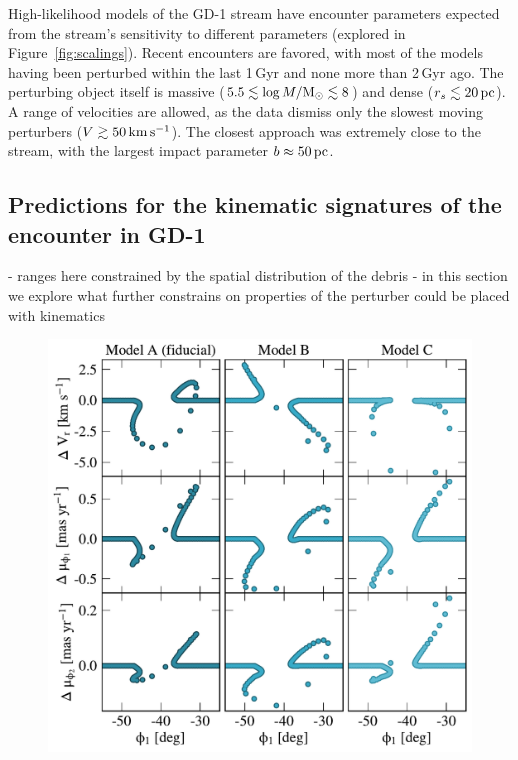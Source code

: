 \documentclass[12pt, modern]{aastex62}
\begin{document}
High-likelihood models of the GD-1 stream have encounter parameters expected from the stream's sensitivity to different parameters (explored in Figure~\ref{fig:scalings}).
Recent encounters are favored, with most of the models having been perturbed within the last 1\,Gyr and none more than 2\,Gyr ago.
The perturbing object itself is massive ($5.5\lesssim\log M/\rm M_\odot\lesssim8$) and dense ($r_s\lesssim20\,\rm pc$).
A range of velocities are allowed, as the data dismiss only the slowest moving perturbers ($V\gtrsim50\,\rm km\,s^{-1}$).
The closest approach was extremely close to the stream, with the largest impact parameter $b\approx50\rm\,pc$.


\subsection{Predictions for the kinematic signatures of the encounter in GD-1}
- ranges here constrained by the spatial distribution of the debris
- in this section we explore what further constrains on properties of the perturber could be placed with kinematics

\begin{figure}
\begin{center}
\includegraphics[width=\textwidth]{kinematic_predictions.pdf}
\end{center}
\caption{}
\label{fig:predictions}
\end{figure}
\end{document}
